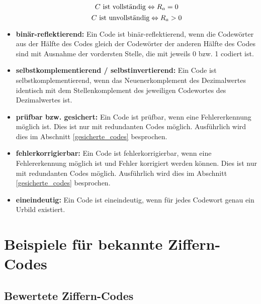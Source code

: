 \begin{itemize}
	$$ C \textnormal{ ist vollständig} \Leftrightarrow R_a = 0 $$
	$$ C \textnormal{ ist unvollständig} \Leftrightarrow R_a > 0 $$
\item
	\textbf{binär-reflektierend:} Ein Code ist binär-reflektierend, wenn die Codewörter aus der Hälfte des Codes gleich der Codewörter der anderen Hälfte des Codes sind mit Ausnahme der vordersten Stelle, die mit jeweils 0 bzw. 1 codiert ist.
\item
	\textbf{selbstkomplementierend / selbstinvertierend:} Ein Code ist selbstkomplementierend, wenn das Neuenerkomplement des Dezimalwertes identisch mit dem Stellenkomplement des jeweiligen Codewortes des Dezimalwertes ist.
\item
	\textbf{prüfbar bzw. gesichert:} Ein Code ist prüfbar, wenn eine Fehlererkennung möglich ist. Dies ist nur mit redundanten Codes möglich. Ausführlich wird dies im Abschnitt \ref{gesicherte_codes} besprochen.
\item
	\textbf{fehlerkorrigierbar:} Ein Code ist fehlerkorrigierbar, wenn eine Fehlererkennung möglich ist und Fehler korrigiert werden können. Dies ist nur mit redundanten Codes möglich. Ausführlich wird dies im Abschnitt \ref{gesicherte_codes} besprochen.
\item
	\textbf{eineindeutig:} Ein Code ist eineindeutig, wenn für jedes Codewort genau ein Urbild existiert.
\end{itemize}

\section{Beispiele für bekannte Ziffern-Codes}
\subsection*{Bewertete Ziffern-Codes}

